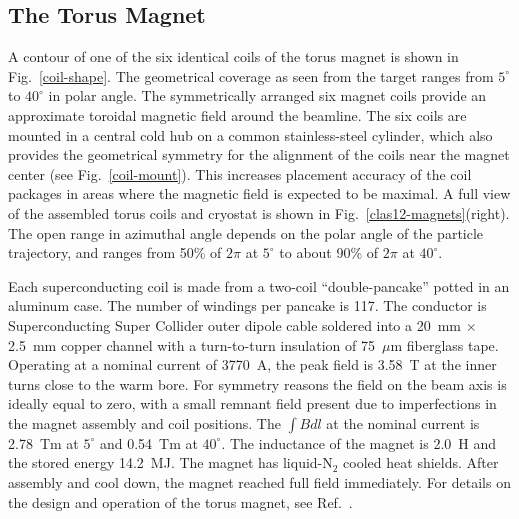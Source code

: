 \documentclass[final,3p]{elsarticle}
\begin{document}
\begin{twocolumn}
\subsection{The Torus Magnet}
\label{torus}

A contour of one of the six identical coils of the torus magnet is shown in Fig.~\ref{coil-shape}. The geometrical
coverage as seen from the target ranges from $5^\circ$ to $40^\circ$ in polar angle. The symmetrically arranged six
magnet coils provide an approximate toroidal magnetic field around the beamline. The six coils are mounted in a
central cold hub on a common stainless-steel cylinder, which also provides the geometrical symmetry for the alignment
of the coils near the magnet center (see Fig.~\ref{coil-mount}). This increases placement accuracy of the coil
packages in areas where the magnetic field is expected to be maximal. A full view of the assembled torus coils and
cryostat is shown in Fig.~\ref{clas12-magnets}(right). The open range in azimuthal angle depends on the polar angle
of the particle trajectory, and ranges from 50\% of $2\pi$ at $5^\circ$ to about 90\% of $2\pi$ at $40^\circ$.

Each superconducting coil is made from a two-coil ``double-pancake'' potted in an aluminum case. The number of
windings per pancake is 117. The conductor is Superconducting Super Collider outer dipole cable soldered into 
a 20~mm $\times$ 2.5~mm copper channel with a turn-to-turn insulation of 75~$\mu$m fiberglass tape. Operating
at a nominal current of 3770~A, the peak field is 3.58~T at the inner turns close to the warm bore. For symmetry
reasons the field on the beam axis is ideally equal to zero, with a small remnant field present due to imperfections in
the magnet assembly and coil positions. The $\int \!\! B dl$ at the nominal current is 2.78~Tm at $5^\circ$ and 0.54~Tm
at $40^\circ$. The inductance of the magnet is 2.0~H and the stored energy 14.2~MJ. The magnet has liquid-N$_2$
cooled heat shields. After assembly and cool down, the magnet reached full field immediately. For details on the
design and operation of the torus magnet, see Ref.~\cite{clas12-magnets}.


\end{twocolumn}
\end{document}
